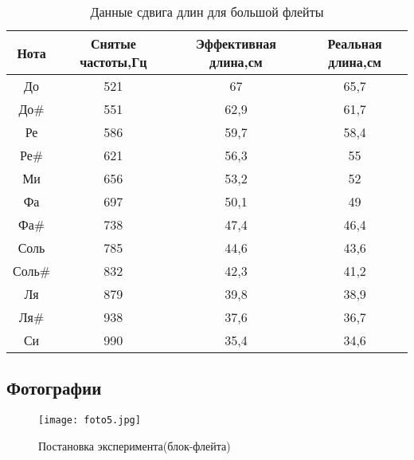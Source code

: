 \begin{table}[!ht]
    \centering
    \begin{tabular}{|c|c|c|c|}
    \hline
    Нота   & Снятые частоты,Гц & Эффективная длина,см & Реальная длина,см \\ \hline
    До     & 521                & 67                   & 65,7             \\ \hline
    До\#   & 551                & 62,9                 & 61,7             \\ \hline
    Ре     & 586                & 59,7                 & 58,4             \\ \hline
    Ре\#   & 621                & 56,3                 & 55               \\ \hline
    Ми     & 656                & 53,2                 & 52               \\ \hline
    Фа     & 697                & 50,1                 & 49               \\ \hline
    Фа\#   & 738                & 47,4                 & 46,4             \\ \hline
    Соль   & 785                & 44,6                 & 43,6             \\ \hline
    Соль\# & 832                & 42,3                 & 41,2             \\ \hline
    Ля     & 879                & 39,8                 & 38,9             \\ \hline
    Ля\#   & 938                & 37,6                 & 36,7             \\ \hline
    Си     & 990                & 35,4                 & 34,6             \\ \hline
    \end{tabular}
    \caption{Данные сдвига длин для большой флейты}
    \label{tab:dannie_dla_big_fleita}
\end{table}
\subsection{Фотографии}
\newpage
\begin{figure}[!p]
    \centering
    \texttt{[image: foto5.jpg]}
    \caption{Постановка эксперимента(блок-флейта)}
    \label{fig:postanovka_experimenta_blok_fleita}
\end{figure}


